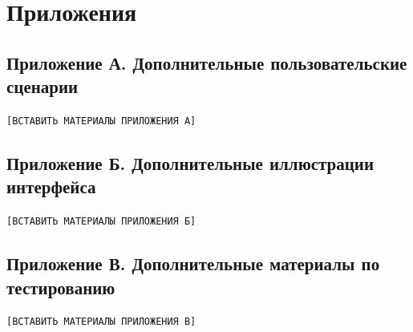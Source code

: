 \section*{Приложения}

\subsection*{Приложение А. Дополнительные пользовательские сценарии}
\texttt{[ВСТАВИТЬ МАТЕРИАЛЫ ПРИЛОЖЕНИЯ А]}

\subsection*{Приложение Б. Дополнительные иллюстрации интерфейса}
\texttt{[ВСТАВИТЬ МАТЕРИАЛЫ ПРИЛОЖЕНИЯ Б]}

\subsection*{Приложение В. Дополнительные материалы по тестированию}
\texttt{[ВСТАВИТЬ МАТЕРИАЛЫ ПРИЛОЖЕНИЯ В]}
